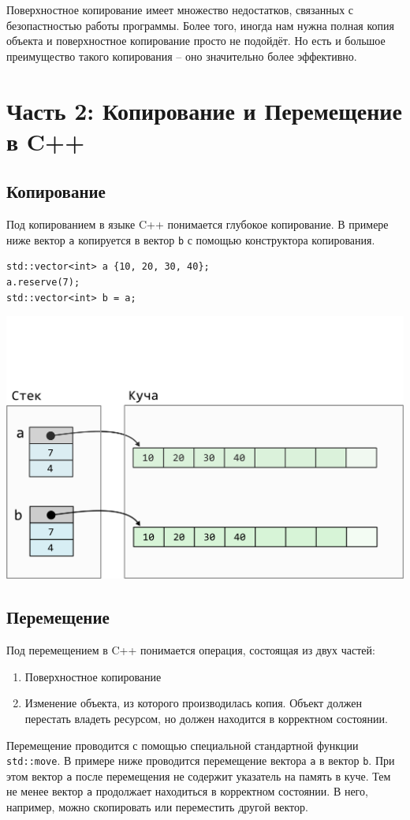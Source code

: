 \documentclass{article}
\begin{document}
Поверхностное копирование имеет множество недостатков, связанных с безопастностью работы программы. Более того, иногда нам нужна полная копия объекта и поверхностное копирование просто не подойдёт. Но есть и большое преимущество такого копирования -- оно значительно более эффективно.

\newpage
\section*{Часть 2: Копирование и Перемещение в C++}
\subsection*{Копирование}
Под копированием в языке C++ понимается глубокое копирование.  В примере ниже вектор \texttt{a} копируется в вектор \texttt{b} с помощью конструктора копирования.
\begin{lstlisting}
std::vector<int> a {10, 20, 30, 40};
a.reserve(7);
std::vector<int> b = a;
\end{lstlisting}
\begin{center}
\vspace*{-2.5cm}
\includegraphics[scale=0.7]{../images/vector_copy.png}
\end{center}

\subsection*{Перемещение}
Под перемещением в C++ понимается операция, состоящая из двух частей:
\begin{enumerate}
\item Поверхностное копирование
\item Изменение объекта, из которого производилась копия. Объект должен перестать владеть ресурсом, но должен находится в корректном состоянии.
\end{enumerate}
Перемещение проводится с помощью специальной стандартной функции \texttt{std::move}. В примере ниже проводится перемещение вектора \texttt{a} в вектор \texttt{b}. При этом вектор \texttt{a} после перемещения не содержит указатель на память в куче. Тем не менее вектор \texttt{a} продолжает находиться в корректном состоянии. В него, например, можно скопировать или переместить другой вектор.
\end{document}
